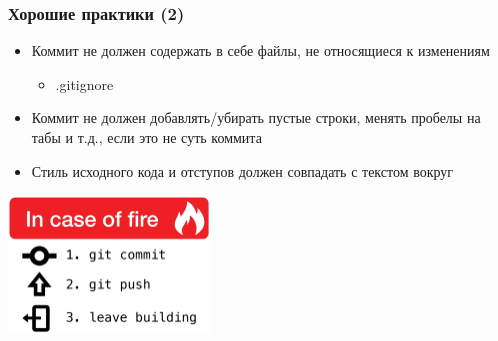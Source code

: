 \documentclass[xetex,mathserif,serif]{beamer}
\begin{document}
    \begin{frame}
        \frametitle{Хорошие практики (2)}
        \begin{itemize}
            \item Коммит не должен содержать в себе файлы, не относящиеся к изменениям
            \begin{itemize}
                \item .gitignore
            \end{itemize}
            \item Коммит не должен добавлять/убирать пустые строки, менять пробелы на табы и т.д., если это не суть коммита
            \item Стиль исходного кода и отступов должен совпадать с текстом вокруг
        \end{itemize}
        \begin{center}
            \includegraphics[width=0.4\textwidth]{inCaseOfFire.png}
        \end{center}
    \end{frame}
\end{document}
